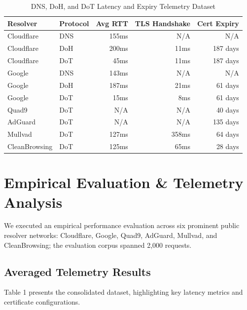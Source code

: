 \documentclass[10pt,journal,compsoc]{IEEEtran}
\begin{document}
\begin{table}[!t]
\centering
\caption{DNS, DoH, and DoT Latency and Expiry Telemetry Dataset}
\begin{tabular}{llrrr}
\toprule
\textbf{Resolver} & \textbf{Protocol} & \textbf{Avg RTT} & \textbf{TLS Handshake} & \textbf{Cert Expiry} \\
\midrule
Cloudflare & DNS & 155ms & N/A & N/A \\
Cloudflare & DoH & 200ms & 11ms & 187 days \\
Cloudflare & DoT & 45ms & 11ms & 187 days \\
Google     & DNS & 143ms & N/A & N/A \\
Google     & DoH & 187ms & 21ms & 61 days \\
Google     & DoT & 15ms  & 8ms  & 61 days \\
Quad9      & DoT & N/A    & N/A   & 40 days \\
AdGuard    & DoT & N/A    & N/A   & 135 days \\
Mullvad    & DoT & 127ms & 358ms& 64 days \\
CleanBrowsing& DoT& 125ms & 65ms & 28 days \\
\bottomrule
\end{tabular}
\end{table}

\section{Empirical Evaluation \& Telemetry Analysis}
We executed an empirical performance evaluation across six prominent public resolver networks: Cloudflare, Google, Quad9, AdGuard, Mullvad, and CleanBrowsing; the evaluation corpus spanned 2,000 requests.

\subsection{Averaged Telemetry Results}
Table 1 presents the consolidated dataset, highlighting key latency metrics and certificate configurations.
\end{document}
